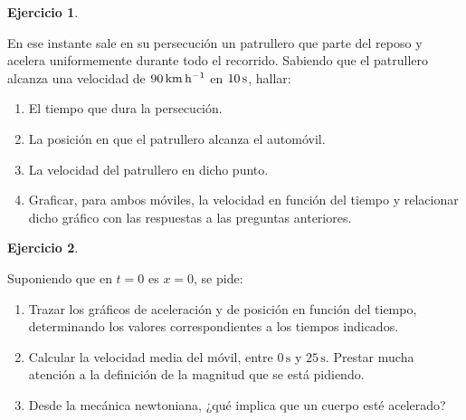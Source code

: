 \documentclass[a4paper,12pt,twoside]{book}
\newtheorem{ejercicio}{{Ejercicio}}[chapter]
\begin{document}
\begin{mdframed}[style=ejercicio-facil]
    \begin{ejercicio}
    \end{ejercicio}
    En ese instante sale en su persecución un patrullero que parte del reposo y acelera uniformemente durante todo el recorrido.
    Sabiendo que el patrullero alcanza una velocidad de $90\,\si{\kilo\metre\per\hour}$ en $10\,\si{\second}$, hallar:
    \begin{enumerate}
        \item El tiempo que dura la persecución.
        \item La posición en que el patrullero alcanza el automóvil.
        \item La velocidad del patrullero en dicho punto.
        \item Graficar, para ambos móviles, la velocidad en función del tiempo y relacionar dicho gráfico con las respuestas a las preguntas anteriores.
    \end{enumerate}
\end{mdframed}

\begin{mdframed}[style=ejercicio-intermedio]
    \begin{ejercicio}
    \end{ejercicio}
    \begin{center}
        \def\svgwidth{0.5\linewidth}
        
    \end{center}
    Suponiendo que en $t=0$ es $x=0$, se pide:
    \begin{enumerate}
        \item Trazar los gráficos de aceleración y de posición en función del tiempo, determinando los valores correspondientes a los tiempos indicados.
        \item Calcular la velocidad media del móvil, entre $0\,\si{\second}$ y $25\,\si{\second}$. Prestar mucha atención a la definición de la magnitud que se está pidiendo.
        \item Desde la mecánica newtoniana, ¿qué implica que un cuerpo esté acelerado?
    \end{enumerate}
\end{mdframed}
\end{document}
